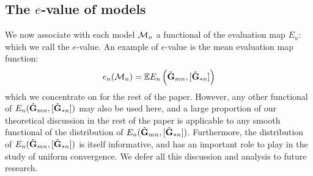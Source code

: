 
\subsection{The $e$-value of models}
We now associate with each model ${\cal{M}}_{n}$ a functional of the evaluation map $E_n$: which we call the $e$-value. An example of $e$-value is the mean evaluation map function: 
%
\begin{equation}
e_n({\cal{M}}_n) = {\mathbb{E}}  E_n \left(  \hat{{\mathbf{G}}}_{ m n}, [\hat{{\mathbf{G}}}_{*n}] \right)
\label{eq:Dsn}
\end{equation}
%
which we concentrate on for the rest of the paper. However, any other functional of $E_n ( \hat{{\mathbf{G}}}_{ m n}, [\hat{{\mathbf{G}}}_{*n}] )$ may also be used here, and a large proportion of our theoretical discussion in the rest of the paper is applicable to any smooth functional of the distribution of $E_n ( \hat{{\mathbf{G}}}_{ m n}, [\hat{{\mathbf{G}}}_{*n}] )$. Furthermore, the distribution of $E_n ( \hat{{\mathbf{G}}}_{m n}, [\hat{{\mathbf{G}}}_{*n}] )$ is itself informative, and has an important role to play in the study of uniform convergence. We defer all this discussion and analysis to future research.

